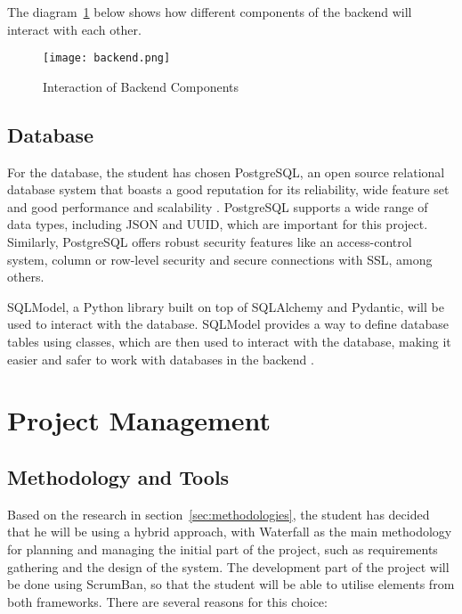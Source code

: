 The diagram~\ref{fig:backend} below shows how different components of the backend will interact with each other.

\begin{figure}[htbp]
    \centering
    \texttt{[image: backend.png]}
    \caption{Interaction of Backend Components}\label{fig:backend}
\end{figure}

\FloatBarrier

\subsection{Database}

For the database, the student has chosen PostgreSQL, an open source relational database system that boasts a good reputation for its reliability, wide feature set and good performance and scalability \parencite{postgres}. PostgreSQL supports a wide range of data types, including JSON and UUID, which are important for this project. Similarly, PostgreSQL offers robust security features like an access-control system, column or row-level security and secure connections with SSL, among others. 

SQLModel, a Python library built on top of SQLAlchemy and Pydantic, will be used to interact with the database. SQLModel provides a way to define database tables using classes, which are then used to interact with the database, making it easier and safer to work with databases in the backend \parencite{sqlmodel}.

\section{Project Management}

\subsection{Methodology and Tools}

Based on the research in section~\ref{sec:methodologies}, the student has decided that he will be using a hybrid approach, with Waterfall as the main methodology for planning and managing the initial part of the project, such as requirements gathering and the design of the system. The development part of the project will be done using ScrumBan, so that the student will be able to utilise elements from both frameworks. There are several reasons for this choice:

